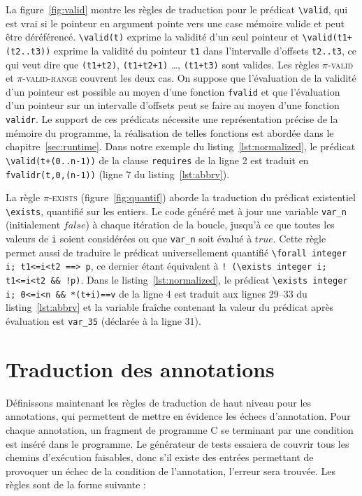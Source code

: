 La figure~\ref{fig:valid} montre les règles de traduction pour le prédicat
\lstinline|\valid|, qui est vrai si le pointeur en argument pointe vers une
case mémoire valide et peut être déréférencé.
\lstinline'\valid(t)' exprime la validité d'un seul pointeur et
\lstinline'\valid(t1+(t2..t3))' exprime la validité du pointeur \lstinline't1'
dans l'intervalle d'offsets \lstinline't2..t3', ce qui veut dire que
\lstinline'(t1+t2)', \lstinline'(t1+t2+1)' \dots, \lstinline'(t1+t3)' sont
valides.
Les règles \textsc{$\pi$-valid} et \textsc{$\pi$-valid-range} couvrent les deux
cas.
On suppose que l'évaluation de la validité d'un pointeur est possible au moyen
d'une fonction \lstinline'fvalid' et que l'évaluation d'un pointeur sur un
intervalle d'offsets peut se faire au moyen d'une fonction
\lstinline'validr'.
Le support de ces prédicats nécessite une représentation précise de la mémoire
du programme, la réalisation de telles fonctions est abordée dans le
chapitre~\ref{sec:runtime}.
Dans notre exemple du listing~\ref{lst:normalized}, le prédicat
\lstinline|\valid(t+(0..n-1))| de la clause \lstinline|requires| de la ligne 2
est traduit en \lstinline[style=c]|fvalidr(t,0,(n-1))| (ligne 7 du
listing~\ref{lst:abbrv}).

La règle \textsc{$\pi$-exists} (figure~\ref{fig:quantif}) aborde la traduction
du prédicat existentiel \lstinline'\exists', quantifié sur les entiers.
Le code généré met à jour une variable \lstinline'var_n' (initialement $false$)
à chaque itération de la boucle, jusqu'à ce que toutes les valeurs de
\lstinline'i' soient considérées ou que \lstinline'var_n' soit évalué à $true$.
Cette règle permet aussi de traduire le prédicat universellement quantifié
\lstinline{\forall integer i; t1<=i<t2 ==> p}, ce dernier étant équivalent à
\lstinline{! (\exists integer i; t1<=i<t2 && !p)}.
Dans le listing~\ref{lst:normalized}, le prédicat
\lstinline{\exists integer i; 0<=i<n && *(t+i)==v} de la ligne 4 est traduit
aux lignes 29--33 du listing~\ref{lst:abbrv} et la variable fraîche contenant la
valeur du prédicat après évaluation est \lstinline|var_35| (déclarée à la
ligne 31).


\section{Traduction des annotations \eacsl}
\label{sec:annot}


Définissons maintenant les règles de traduction de haut niveau pour les
annotations, qui permettent de mettre en évidence les échecs d'annotation.
Pour chaque annotation, un fragment de programme C se terminant par une
condition est inséré dans le programme.
Le générateur de tests essaiera de couvrir tous les chemins d'exécution
faisables, donc s'il existe des entrées permettant de provoquer un échec de la
condition de l'annotation, l'erreur sera trouvée.
Les règles sont de la forme suivante :


